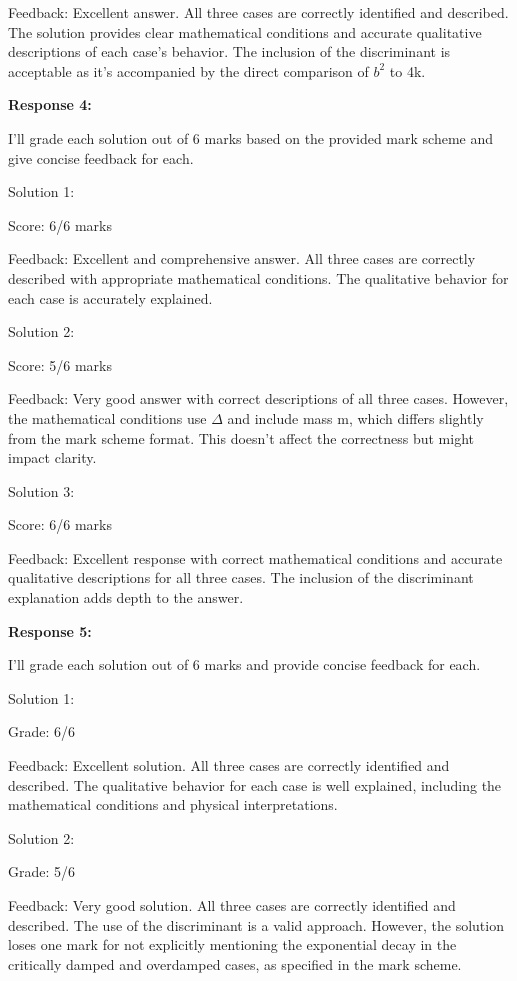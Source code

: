 \documentclass[a4paper,11pt]{article}
\begin{document}
Feedback: Excellent answer. All three cases are correctly identified and described. The solution provides clear mathematical conditions and accurate qualitative descriptions of each case's behavior. The inclusion of the discriminant is acceptable as it's accompanied by the direct comparison of \(b^2\) to 4k.

\bigskip
\textbf{Response 4:}

I'll grade each solution out of 6 marks based on the provided mark scheme and give concise feedback for each.

Solution 1:

Score: 6/6 marks

Feedback: Excellent and comprehensive answer. All three cases are correctly described with appropriate mathematical conditions. The qualitative behavior for each case is accurately explained.

Solution 2:

Score: 5/6 marks

Feedback: Very good answer with correct descriptions of all three cases. However, the mathematical conditions use \(\Delta\) and include mass m, which differs slightly from the mark scheme format. This doesn't affect the correctness but might impact clarity.

Solution 3:

Score: 6/6 marks

Feedback: Excellent response with correct mathematical conditions and accurate qualitative descriptions for all three cases. The inclusion of the discriminant explanation adds depth to the answer.

\bigskip
\textbf{Response 5:}

I'll grade each solution out of 6 marks and provide concise feedback for each.

Solution 1:

Grade: 6/6

Feedback: Excellent solution. All three cases are correctly identified and described. The qualitative behavior for each case is well explained, including the mathematical conditions and physical interpretations.

Solution 2:

Grade: 5/6

Feedback: Very good solution. All three cases are correctly identified and described. The use of the discriminant is a valid approach. However, the solution loses one mark for not explicitly mentioning the exponential decay in the critically damped and overdamped cases, as specified in the mark scheme.
\end{document}
